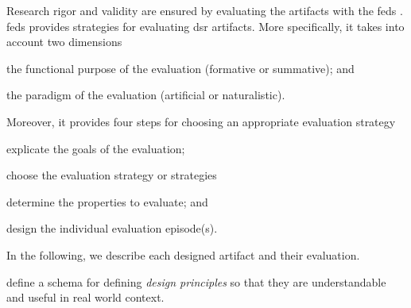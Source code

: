 Research rigor and validity are ensured by evaluating the artifacts with the \gls{feds} \citep{Venable2016}. \Gls{feds} provides strategies for evaluating \gls{dsr} artifacts. More specifically, it takes into account two dimensions
\begin{inparaenum}[\itshape i)]
	\item the functional purpose of the
	evaluation (formative or summative); and 
	\item the paradigm of the evaluation (artificial or naturalistic).
\end{inparaenum} 
Moreover, it provides four steps for choosing an appropriate evaluation strategy
\begin{inparaenum}[\itshape i)]
	\item explicate the goals of the evaluation;
	\item choose the evaluation strategy or strategies
	\item determine the properties to evaluate; and
	\item design the individual evaluation episode(s). 
\end{inparaenum} In the following, we describe each designed artifact and their evaluation. 



\cite{Gregor2020} define a schema for defining \emph{design principles} so that they are understandable and useful in real world context. 


%

